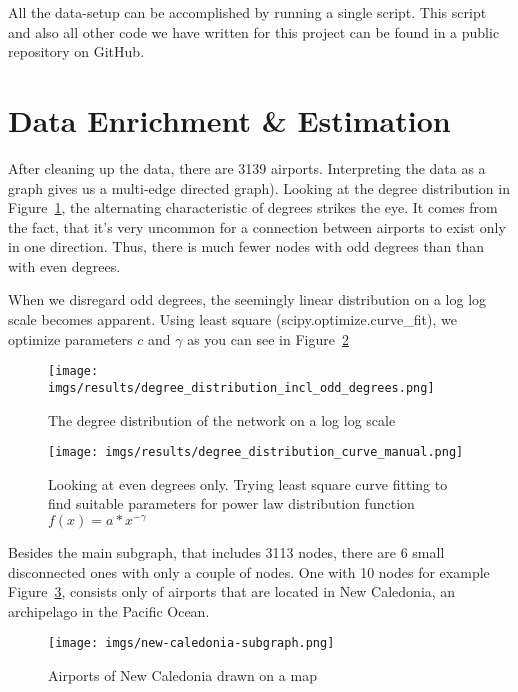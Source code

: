 \documentclass[twocolumn]{tum-article}
\begin{document}
All the data-setup can be accomplished by running a single script.
This script and also all other code we have written for this project can be found in a public repository on GitHub\cite{repository}.

\section{Data Enrichment \& Estimation}
After cleaning up the data, there are 3139 airports. 
Interpreting the data as a graph gives us a multi-edge directed graph).
Looking at the degree distribution in Figure~\ref{fig:degree_distribution}, the alternating characteristic of degrees strikes the eye. It comes from the fact, that it's very uncommon for a connection between airports to exist only in one direction. Thus, there is much fewer nodes with odd degrees than than with even degrees. 

When we disregard odd degrees, the seemingly linear distribution on a log log scale becomes apparent. Using least square (scipy.optimize.curve\_fit), we optimize parameters $c$ and $\gamma$ as you can see in Figure~\ref{fig:degree_distribution_curves}

\begin{figure}
	\centering
	\texttt{[image: imgs/results/degree\_distribution\_incl\_odd\_degrees.png]}
	\caption{
The degree distribution of the network on a log log scale }
	\label{fig:degree_distribution}
\end{figure}

\begin{figure}
	\centering
	\texttt{[image: imgs/results/degree\_distribution\_curve\_manual.png]}
	\caption{
Looking at even degrees only. Trying least square curve fitting to find suitable parameters for power law distribution function $f(x) = a * x^{-\gamma}$}
	\label{fig:degree_distribution_curves}
\end{figure}

Besides the main subgraph, that includes 3113 nodes, there are 6 small disconnected ones with only a couple of nodes.
One with 10 nodes for example Figure~\ref{fig:new_caledonia}, consists only of airports that are located in New Caledonia, an archipelago in the Pacific Ocean. 
\begin{figure}
	\centering
	\texttt{[image: imgs/new-caledonia-subgraph.png]}
	\caption{Airports of New Caledonia drawn on a map}
	\label{fig:new_caledonia}
\end{figure}
\end{document}
